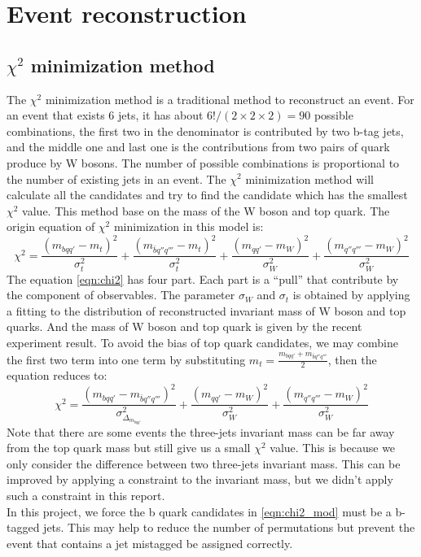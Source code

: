 \section{Event reconstruction}\label{sec:Event reconstruction}
\subsection{$\chi^{2}$ minimization method}\label{subsec:chi-square}
The $\chi^{2}$ minimization method is a traditional method to reconstruct an event. For an event that exists 6 jets, it has about $6!/(2\times2\times2)=90$ possible combinations, the first two in the denominator is contributed by two b-tag jets, and the middle one and last one is the contributions from two pairs of quark produce by W bosons. The number of possible combinations is proportional to the number of existing jets in an event. The $\chi^{2}$ minimization method will calculate all the candidates and try to find the candidate which has the smallest $\chi^{2}$ value. This method base on the mass of the W boson and top quark. The origin equation of $\chi^{2}$ minimization in this model is:
\begin{equation}\label{eqn:chi2}
	\chi^{2} = \frac{( m_{bqq'} - m_{t} )^{2}}{\sigma_{t}^{2}} + \frac{( m_{\bar{b}q''q'''} - m_{t} )^{2}}{\sigma_{t}^{2}} + \frac{(m_{qq'} - m_{W})^{2}}{\sigma^{2}_{W}} + \frac{(m _{q''q'''} - m_{W})^{2}}{\sigma^{2}_{W}}
\end{equation} 
The equation \ref{eqn:chi2} has four part. Each part is a ``pull'' that contribute by the component of observables. The parameter $\sigma_{W}$ and $\sigma_{t}$ is obtained by applying a fitting to the distribution of reconstructed invariant mass of W boson and top quarks. And the mass of W boson and top quark is given by the recent experiment result. To avoid the bias of top quark candidates, we may combine the first two term into one term by substituting $m_{t}=\frac{m_{bqq'} + m_{\bar{b}q''q'''}}{2}$, then the equation reduces to: 
\begin{equation}\label{eqn:chi2_mod}
	\chi^{2} = \frac{(m_{bqq'} - m_{\bar{b}q''q'''})^{2}}{\sigma^{2}_{\Delta_{m_{bqq'}}}}  + \frac{(m_{qq'} - m_{W})^{2}}{\sigma^{2}_{W}} + \frac{(m _{q''q'''} - m_{W})^{2}}{\sigma^{2}_{W}}
\end{equation} 
Note that there are some events the three-jets invariant mass can be far away from the top quark mass but still give us a small $\chi^{2}$ value. This is because we only consider the difference between two three-jets invariant mass. This can be improved by applying a constraint to the invariant mass\cite{Mccarthy:2015ucy}, but we didn't apply such a constraint in this report. 
\\
In this project, we force the b quark candidates in \ref{eqn:chi2_mod} must be a b-tagged jets. This may help to reduce the number of permutations but prevent the event that contains a jet mistagged be assigned correctly.
